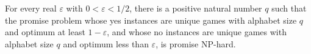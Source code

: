 \begin{definition}
\label{BooleanAnalysis.GaussianSpace.UniqueGames.UniqueGamesConjecture}
\leanok
{}
For every real $\varepsilon$ with $0<\varepsilon<1/2$, there is a positive natural
number $q$ such that the promise problem whose yes instances are unique games with
alphabet size $q$ and optimum at least $1-\varepsilon$, and whose no instances are
unique games with alphabet size $q$ and optimum less than $\varepsilon$, is promise
NP-hard.
\end{definition}
